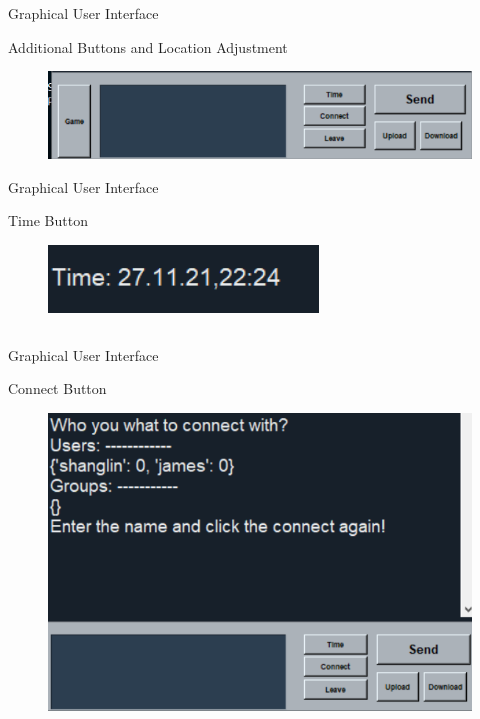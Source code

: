 \documentclass[a4paper,10pt]{beamer}
\begin{document}
\begin{frame}{Graphical User Interface}
\begin{block}{Additional Buttons and Location Adjustment}
\begin{figure}
    \centering
    \includegraphics[width=0.85\linewidth]{surface.png}
\end{figure}
\end{block}
\end{frame}

\begin{frame}{Graphical User Interface}

\begin{block}{Time Button}
\begin{figure}
    \centering
    \includegraphics[width=0.3\linewidth]{time.png}
\end{figure}
	\inputminted[linenos]{python}{time.py}
\end{block}
\end{frame}

\begin{frame}{Graphical User Interface}
\begin{block}{Connect Button}
\begin{figure}
    \centering
    \includegraphics[width=0.7\linewidth]{connect1.png}
\end{figure}
\end{block}
\end{frame}
\end{document}
